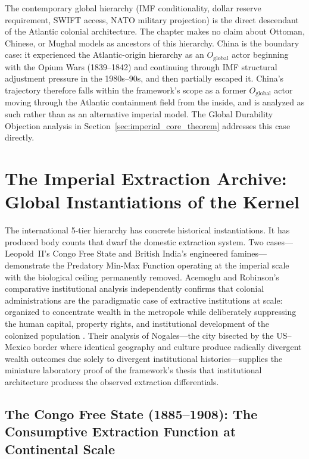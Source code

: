 The contemporary global hierarchy (IMF conditionality, dollar reserve requirement, SWIFT access, NATO military projection) is the direct descendant of the Atlantic colonial architecture. The chapter makes no claim about Ottoman, Chinese, or Mughal models as ancestors of this hierarchy. China is the boundary case: it experienced the Atlantic-origin hierarchy as an $O_{\text{global}}$ actor beginning with the Opium Wars (1839--1842) and continuing through IMF structural adjustment pressure in the 1980s--90s, and then partially escaped it. China's trajectory therefore falls within the framework's scope as a former $O_{\text{global}}$ actor moving through the Atlantic containment field from the inside, and is analyzed as such rather than as an alternative imperial model. The Global Durability Objection analysis in Section~\ref{sec:imperial_core_theorem} addresses this case directly.

\section{The Imperial Extraction Archive: Global Instantiations of the Kernel}

The international 5-tier hierarchy has concrete historical instantiations. It has produced body counts that dwarf the domestic extraction system. Two cases---Leopold~II's Congo Free State and British India's engineered famines---demonstrate the Predatory Min-Max Function operating at the imperial scale with the biological ceiling permanently removed. Acemoglu and Robinson's comparative institutional analysis independently confirms that colonial administrations are the paradigmatic case of extractive institutions at scale: organized to concentrate wealth in the metropole while deliberately suppressing the human capital, property rights, and institutional development of the colonized population \cite{acemoglu_robinson}. Their analysis of Nogales---the city bisected by the US--Mexico border where identical geography and culture produce radically divergent wealth outcomes due solely to divergent institutional histories---supplies the miniature laboratory proof of the framework's thesis that institutional architecture produces the observed extraction differentials.

\subsection{The Congo Free State (1885--1908): The Consumptive Extraction Function at Continental Scale}

